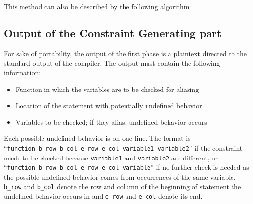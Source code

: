 This method can also be described by the following algorithm:
\\

\noindent{}


\subsection{Output of the Constraint Generating part}
For sake of portability, the output of the first phase is a plaintext directed to the standard output of the compiler. The output must contain the following information:

\begin{itemize}
\item Function in which the variables are to be checked for aliasing
\item Location of the statement with potentially undefined behavior
\item Variables to be checked; if they alias, undefined behavior occurs
\end{itemize}

Each possible undefined behavior is on one line. The format is
\\``\verb|function b_row b_col e_row e_col variable1 variable2|''
if the constraint needs to be checked because \verb|variable1| and \verb|variable2| are different, or
\\``\verb|function b_row b_col e_row e_col variable|''
if no further check is needed as the possible undefined behavior comes from occurrences of the same variable. \verb|b_row| and \verb|b_col| denote the row and column of the beginning of statement the undefined behavior occurs in and \verb|e_row| and \verb|e_col| denote its end.

